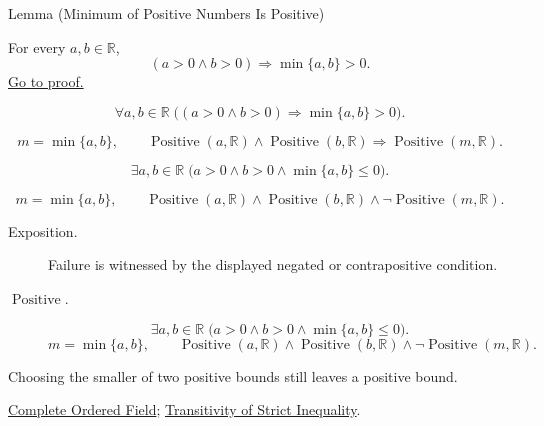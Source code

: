 \begin{lemmabox}{Lemma (Minimum of Positive Numbers Is Positive)}
\begin{lemma}
\label{lem:minimum-of-positive-numbers-is-positive}
For every $a,b\in\mathbb{R}$,
\[
  (a>0\land b>0)
  \Longrightarrow
  \min\{a,b\}>0.
\]
\hyperref[prf:minimum-of-positive-numbers-is-positive]{Go to proof.}
\end{lemma}
\end{lemmabox}
\begin{remark*}
\[
\forall a,b\in\mathbb{R}\;\bigl((a>0\land b>0)\Longrightarrow \min\{a,b\}>0\bigr).
\]
\end{remark*}
\begin{remark*}
\[
m=\min\{a,b\},\qquad
\operatorname{Positive}(a,\mathbb{R})\land\operatorname{Positive}(b,\mathbb{R})
\Longrightarrow \operatorname{Positive}(m,\mathbb{R}).
\]
\end{remark*}
\begin{remark*}
\[
\exists a,b\in\mathbb{R}\;\bigl(a>0\land b>0\land \min\{a,b\}\leq 0\bigr).
\]
\end{remark*}
\begin{remark*}
\[
m=\min\{a,b\},\qquad
\operatorname{Positive}(a,\mathbb{R})\land\operatorname{Positive}(b,\mathbb{R})\land
\neg\operatorname{Positive}(m,\mathbb{R}).
\]
\end{remark*}

\begin{remark*}
\begin{description}
  \item[Exposition.]
  Failure is witnessed by the displayed negated or contrapositive condition.

  \item[\(\operatorname{Positive}.\)]
  \[
\exists a,b\in\mathbb{R}\;\bigl(a>0\land b>0\land \min\{a,b\}\leq 0\bigr).
\]
\[
m=\min\{a,b\},\qquad
\operatorname{Positive}(a,\mathbb{R})\land\operatorname{Positive}(b,\mathbb{R})\land
\neg\operatorname{Positive}(m,\mathbb{R}).
\]
\end{description}
\end{remark*}
\begin{remark*}[Interpretation]
Choosing the smaller of two positive bounds still leaves a positive bound.
\end{remark*}
\begin{dependencies}
\hyperref[def:real-ordered-field]{Complete Ordered Field};
\hyperref[thm:ineq-transitivity-strict]{Transitivity of Strict Inequality}.
\end{dependencies}
